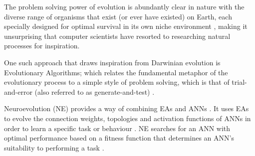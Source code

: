 The problem solving power of evolution is abundantly clear in nature with the diverse range of organisms that exist (or ever have existed) on Earth, each specially designed for optimal survival in its own niche environment \cite{RefWorks:33}, making it unsurprising that computer scientists have resorted to researching natural processes for inspiration. 

One such approach that draws inspiration from Darwinian evolution is Evolutionary Algorithms; which relates the fundamental metaphor of the evolutionary process to a simple style of problem solving, which is that of trial-and-error (also referred to as generate-and-test) \cite{RefWorks:33}.






Neuroevolution (NE) provides a way of combining EAs and ANNs \cite{RefWorks:31}. It uses EAs to evolve the connection weights, topologies and activation functions of ANNs in order to learn a specific task or behaviour \cite{gomez1999solving}. NE searches for an ANN with optimal performance based on a fitness function that determines an ANN's suitability to performing a task \cite{RefWorks:31}.


